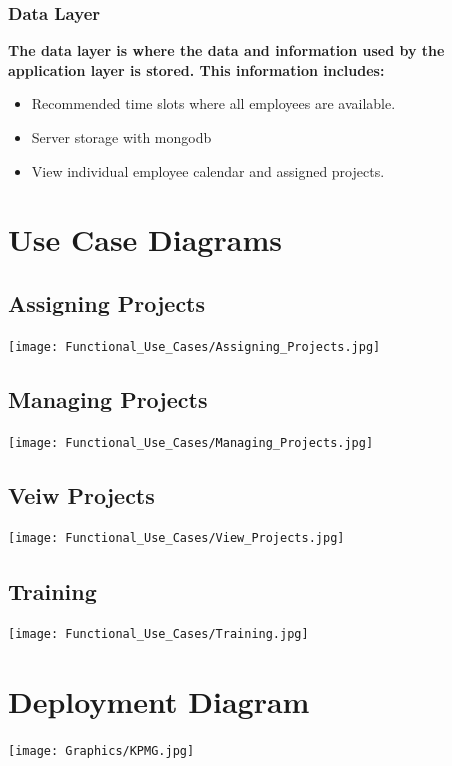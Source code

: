 \documentclass[a4paper,12pt]{article}
\begin{document}
  \subsubsection{Data Layer}
    \textbf{The data layer is where the data and information used by the application layer is stored. This information includes:}
    \begin{itemize}
        \item Recommended time slots where all employees are available. 
        \item Server storage with mongodb
        \item View individual employee calendar and assigned projects. 
    \end{itemize}
    
\section{Use Case Diagrams}
	\subsection{Assigning Projects}
	\texttt{[image: Functional\_Use\_Cases/Assigning\_Projects.jpg]}
	\subsection{Managing Projects}
	\texttt{[image: Functional\_Use\_Cases/Managing\_Projects.jpg]}
	\subsection{Veiw Projects}
	\texttt{[image: Functional\_Use\_Cases/View\_Projects.jpg]}
	\subsection{Training}
	\texttt{[image: Functional\_Use\_Cases/Training.jpg]}
	
\section{Deployment Diagram}
\texttt{[image: Graphics/KPMG.jpg]}

\newpage
\end{document}
